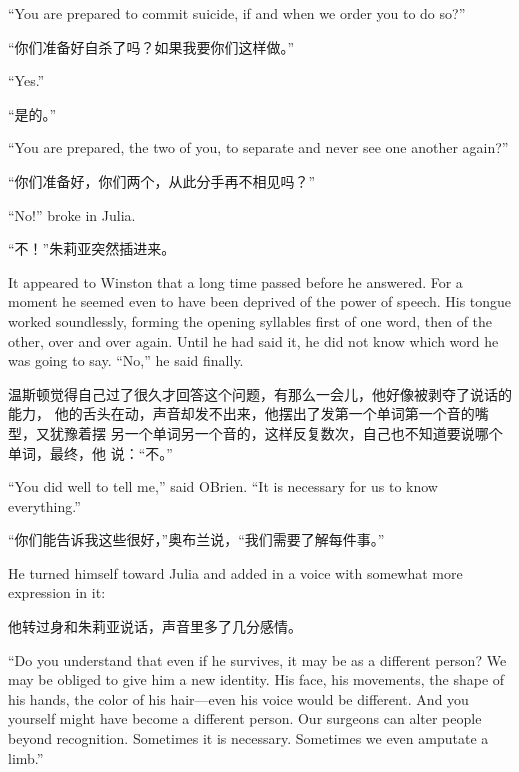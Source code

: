\begin{paracol}{2}
``You are prepared to commit suicide, if and when we order you to do so?''

\switchcolumn

``你们准备好自杀了吗？如果我要你们这样做。''

\switchcolumn*

``Yes.''

\switchcolumn

``是的。''

\switchcolumn*

``You are prepared, the two of you, to separate and never see one another
again?''

\switchcolumn

``你们准备好，你们两个，从此分手再不相见吗？''

\switchcolumn*

``No!'' broke in Julia.

\switchcolumn

``不！''朱莉亚突然插进来。

\switchcolumn*

It appeared to Winston that a long time passed before he answered. For a
moment he seemed even to have been deprived of the power of speech. His
tongue worked soundlessly, forming the opening syllables first of one
word, then of the other, over and over again. Until he had said it, he
did not know which word he was going to say. ``No,'' he said finally.

\switchcolumn

温斯顿觉得自己过了很久才回答这个问题，有那么一会儿，他好像被剥夺了说话的能力，
他的舌头在动，声音却发不出来，他摆出了发第一个单词第一个音的嘴型，又犹豫着摆
另一个单词另一个音的，这样反复数次，自己也不知道要说哪个单词，最终，他
说：``不。''

\switchcolumn*

``You did well to tell me,'' said O\textquotesingle Brien. ``It is
necessary for us to know everything.''

\switchcolumn

``你们能告诉我这些很好，''奥布兰说，``我们需要了解每件事。''

\switchcolumn*

He turned himself toward Julia and added in a voice with somewhat more
expression in it:

\switchcolumn

他转过身和朱莉亚说话，声音里多了几分感情。

\switchcolumn*

``Do you understand that even if he survives, it may be as a different
person? We may be obliged to give him a new identity. His face, his
movements, the shape of his hands, the color of his hair---even his
voice would be different. And you yourself might have become a different
person. Our surgeons can alter people beyond recognition. Sometimes it
is necessary. Sometimes we even amputate a limb.''


\end{paracol}
